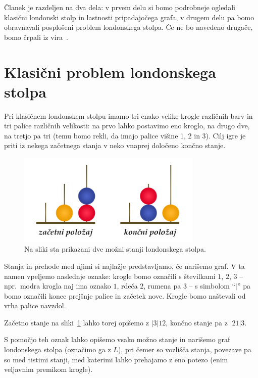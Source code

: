 \documentclass[twoside,11pt]{article}
\begin{document}
Članek je razdeljen na dva dela: v prvem delu si bomo podrobneje ogledali klasični londonski stolp in lastnosti pripadajočega grafa, v drugem delu pa bomo obravnavali posplošeni problem londonskega stolpa. Če ne bo navedeno drugače, bomo črpali iz vira~\cite{bib:tohmyths}.

\section{Klasični problem londonskega stolpa}
Pri klasičnem londonskem stolpu imamo tri enako velike krogle različnih barv in tri palice različnih velikosti: na prvo lahko postavimo eno kroglo, na drugo dve, na tretjo pa tri (temu bomo rekli, da imajo palice višine 1, 2 in 3). Cilj igre je priti iz nekega začetnega stanja v neko vnaprej določeno končno stanje.

\begin{figure}[h]
    \includegraphics[width=250pt]{../img/london-tower.png}
    \caption{Na sliki sta prikazani dve možni stanji londonskega stolpa.}
    \label{fig:stanji}
\end{figure}

Stanja in prehode med njimi si najlažje predstavljamo, če narišemo graf. V ta namen vpeljemo naslednje oznake:
krogle bomo označili s številkami $1$, $2$, $3$ -- npr.\ modra krogla naj ima oznako $1$, rdeča $2$, rumena pa $3$ -- s simbolom ``$|$'' pa bomo označili konec prejšnje palice in začetek nove. Krogle bomo naštevali od vrha palice navzdol.

\begin{primer}
    Začetno stanje na sliki~\ref{fig:stanji} lahko torej opišemo z $|3|12$, končno stanje pa z $|21|3$.
\end{primer}
\medskip

S pomočjo teh oznak lahko opišemo vsako možno stanje in narišemo graf londonskega stolpa (označimo ga z $L$), pri čemer so vozlišča stanja, povezave pa so med tistimi stanji, med katerimi lahko prehajamo z eno potezo (enim veljavnim premikom krogle).
\end{document}
